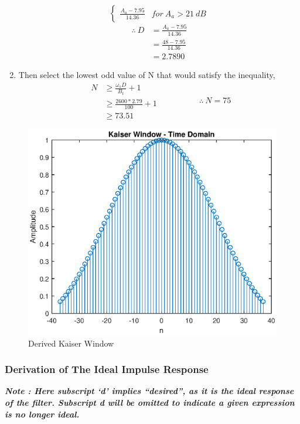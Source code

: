 \documentclass[a4paper,11pt]{article}%
\begin{document}
\begin{enumerate}[\hspace{1cm}a.)]
\[\begin{cases}
	\frac{A_a - 7.95}{14.36} & for ~ A_a > 21 ~dB
\end{cases}
\]\hspace{2cm}
\[
\begin{split}
	\therefore~ D &= \frac{A_a - 7.95}{14.36}\\
	&=\frac{48 - 7.95}{14.36}\\
	&=  2.7890
\end{split}
\]

\item Then select the lowest odd value of N that would satisfy the inequality,
\[
\begin{split}
	N  & \geq \frac{\omega_sD}{B_t}+1\\
	&\geq \frac{2600*2.79}{100}+1\\
	&\geq 73.51
\end{split}
\hspace{2cm}
\therefore~	N = 75
\]
\end{enumerate}

\begin{figure}[!h]
	\centering
	\includegraphics[scale=0.4]{figures/kaisertime}
	\caption{Derived Kaiser Window}
\end{figure}

\subsubsection{Derivation of The Ideal Impulse Response}

\textbf{\textit{Note : Here subscript `d' implies ``desired'', as it is the ideal response of the filter. Subscript d will be omitted to indicate a given expression is no longer ideal.\\}}
\end{document}
